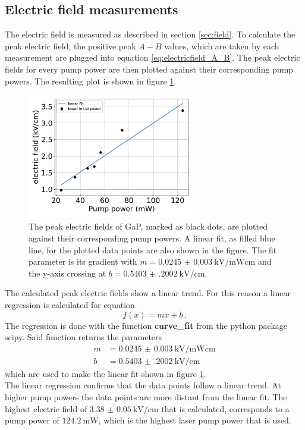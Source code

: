 \subsection{Electric field measurements}
\FloatBarrier
The electric field is measured as described in section \ref{sec:field}.
To calculate the peak electric field, the positive peak $A-B$ values, which are taken by each measurement are plugged into equation \eqref{eq:electricfield_A_B}.
The peak electric fields for every pump power are then plotted against their corresponding pump powers.
The resulting plot is shown in figure \ref{fig:gap_electricfield}.\FloatBarrier
\begin{figure}
    \centering
    \includegraphics[width=0.65\textwidth]{Plots/eltric_field_GaP.pdf}
    \caption{The peak electric fields of GaP, marked as black dots, are plotted against their corresponding pump powers.
    A linear fit, as filled blue line, for the plotted data points are also shown in the figure.
    The fit parameter is its gradient with $m=\SI{0.0245(30)}{\kilo\V\per\milli\W\centi\meter}$ and the y-axis crossing at $b=\SI{0.5403(2002)}{\kilo\V\per\centi\meter}$.}
    \label{fig:gap_electricfield}
\end{figure}\FloatBarrier
The calculated peak electric fields show a linear trend.
For this reason a linear regression is calculated for equation  
\begin{equation}
    f(x) = mx+b \,.
\end{equation}
The regression is done with the function \textbf{curve\_fit} from the python package scipy.
Said function returns the parameters
\begin{align*} 
    m &= \SI{0.0245(30)}{\kilo\V\per\milli\W\centi\meter}\\
    b &= \SI{0.5403(2002)}{\kilo\V\per\centi\meter}
\end{align*}
which are used to make the linear fit shown in figure \ref{fig:gap_electricfield}.
\\
The linear regression confirms that the data points follow a linear trend.
At higher pump powers the data points are more distant from the linear fit.
The highest electric field of $\SI{3.38(5)}{\kilo\V\per\centi\meter}$ that is calculated, corresponds to a pump power of $\SI{124.2}{\milli\W}$, which is the highest laser pump power that is used.
\FloatBarrier
